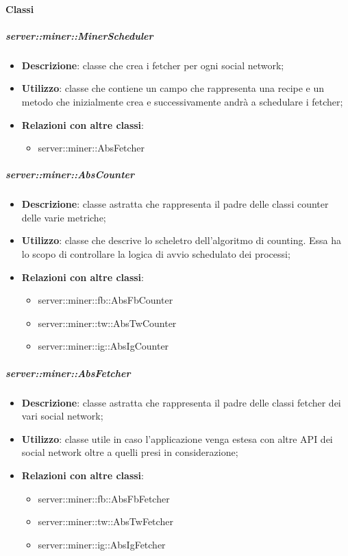 \paragraph{Classi} %
		\subparagraph{server::miner::MinerScheduler} %
		\label{subp:server_miner_MinerScheduler}
			\begin{itemize}
				\item \textbf{Descrizione}: classe che crea i fetcher per ogni social network;
				\item \textbf{Utilizzo}: classe che contiene un campo che rappresenta una recipe e un metodo che inizialmente crea e successivamente andrà a schedulare i fetcher;
				\item \textbf{Relazioni con altre classi}:
					\begin{itemize}
						\item server::miner::AbsFetcher
					\end{itemize}
			\end{itemize}

		\subparagraph{server::miner::AbsCounter} %
		\label{subp:server_miner_AbsCounter}
			\begin{itemize}
				\item \textbf{Descrizione}: classe astratta che rappresenta il padre delle classi counter delle varie metriche;
				\item \textbf{Utilizzo}: classe che descrive lo scheletro dell'algoritmo di counting. Essa ha lo scopo di controllare la logica di avvio schedulato dei processi;
				\item \textbf{Relazioni con altre classi}:
					\begin{itemize}
						\item server::miner::fb::AbsFbCounter
						\item server::miner::tw::AbsTwCounter
						\item server::miner::ig::AbsIgCounter
					\end{itemize}
			\end{itemize}

		\subparagraph{server::miner::AbsFetcher} %
		\label{subp:server_miner_AbsFetcher}
				\begin{itemize}
				\item \textbf{Descrizione}: classe astratta che rappresenta il padre delle classi fetcher dei vari social network;
				\item \textbf{Utilizzo}: classe utile in caso l'applicazione venga estesa con altre API dei social network oltre a quelli presi in considerazione;
				\item \textbf{Relazioni con altre classi}:
					\begin{itemize}
						\item server::miner::fb::AbsFbFetcher
						\item server::miner::tw::AbsTwFetcher
						\item server::miner::ig::AbsIgFetcher
					\end{itemize}
			\end{itemize}


